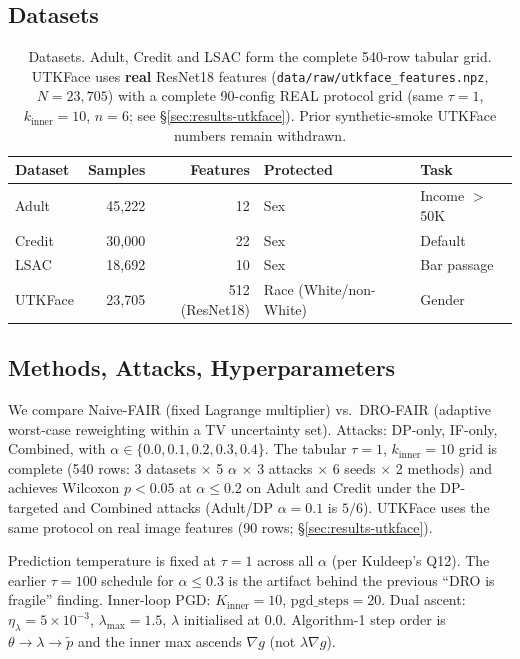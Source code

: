 \subsection{Datasets}
\begin{table}[h]
\centering
\begin{tabular}{lrrll}
\toprule
Dataset & Samples & Features & Protected & Task \\
\midrule
Adult & 45,222 & 12 & Sex & Income $>$50K \\
Credit & 30,000 & 22 & Sex & Default \\
LSAC & 18,692 & 10 & Sex & Bar passage \\
UTKFace & 23{,}705 & 512 (ResNet18) & Race (White/non-White) & Gender \\
\bottomrule
\end{tabular}
\caption{Datasets.  Adult, Credit and LSAC form the complete 540-row
tabular grid.  UTKFace uses \textbf{real} ResNet18 features
(\texttt{data/raw/utkface\_features.npz}, $N{=}23{,}705$) with a complete
90-config REAL protocol grid (same $\tau{=}1$, $k_{\mathrm{inner}}{=}10$,
$n{=}6$; see \S\ref{sec:results-utkface}).  Prior synthetic-smoke UTKFace
numbers remain withdrawn.}
\label{tab:datasets}
\end{table}

\subsection{Methods, Attacks, Hyperparameters}
We compare Naive-FAIR (fixed Lagrange multiplier) vs.\ DRO-FAIR
(adaptive worst-case reweighting within a TV uncertainty set).
Attacks: DP-only, IF-only, Combined, with $\alpha\in\{0.0, 0.1, 0.2,
0.3, 0.4\}$.  The tabular $\tau{=}1$, $k_{\mathrm{inner}}{=}10$
grid is complete (540 rows: 3 datasets $\times$ 5 $\alpha$ $\times$ 3
attacks $\times$ 6 seeds $\times$ 2 methods) and achieves Wilcoxon
$p{<}0.05$ at $\alpha\le0.2$ on Adult and Credit under the DP-targeted and
Combined attacks (Adult/DP $\alpha{=}0.1$ is $5/6$).  UTKFace uses the same
protocol on real image features (90 rows; \S\ref{sec:results-utkface}).

Prediction temperature is fixed at $\tau{=}1$ across all
$\alpha$ (per Kuldeep's Q12).  The earlier $\tau{=}100$ schedule for
$\alpha\le 0.3$ is the artifact behind the previous ``DRO is
fragile'' finding.  Inner-loop PGD: $K_{\mathrm{inner}}{=}10$,
$\mathrm{pgd\_steps}{=}20$.  Dual ascent: $\eta_{\lambda}{=}5\!\times\!10^{-3}$,
$\lambda_{\max}{=}1.5$, $\lambda$ initialised at $0.0$.
Algorithm-1 step order is $\theta\!\to\!\lambda\!\to\!\tilde p$ and the
inner max ascends $\nabla g$ (not $\lambda\nabla g$).


